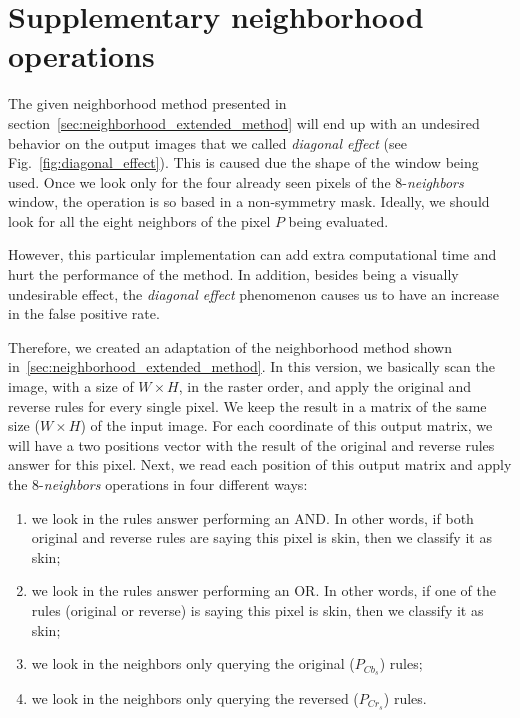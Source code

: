 \section{Supplementary neighborhood operations}
\label{sec:sup_neighborhood_operations}
The given neighborhood method presented in section~\ref{sec:neighborhood_extended_method} will end up with an undesired behavior on the output images that we called \textit{diagonal effect} (see Fig.~\ref{fig:diagonal_effect}). This is caused due the shape of the window being used. Once we look only for the four already seen pixels of the 8-\textit{neighbors} window, the operation is so based in a non-symmetry mask. Ideally, we should look for all the eight neighbors of the pixel $P$ being evaluated.

However, this particular implementation can add extra computational time and hurt the performance of the method. In addition, besides being a visually undesirable effect, the \textit{diagonal effect} phenomenon causes us to have an increase in the false positive rate.

Therefore, we created an adaptation of the neighborhood method shown in~\ref{sec:neighborhood_extended_method}. In this version, we basically scan the image, with a size of $W \times H$, in the raster order, and apply the original and reverse rules for every single pixel. We keep the result in a matrix of the same size ($W \times H$) of the input image. For each coordinate of this output matrix, we will have a two positions vector with the result of the original and reverse rules answer for this pixel. Next, we read each position of this output matrix and apply the 8-\textit{neighbors} operations in four different ways:

\begin{enumerate}[label={(\arabic*)}]
    \item we look in the rules answer performing an AND. In other words, if both original and reverse rules are saying this pixel is skin, then we classify it as skin;
    \item we look in the rules answer performing an OR. In other words, if one of the rules (original or reverse) is saying this pixel is skin, then we classify it as skin;
    \item we look in the neighbors only querying the original ($P_{Cb_s}$) rules;
    \item we look in the neighbors only querying the reversed ($P_{Cr_s}$) rules.
\end{enumerate}

